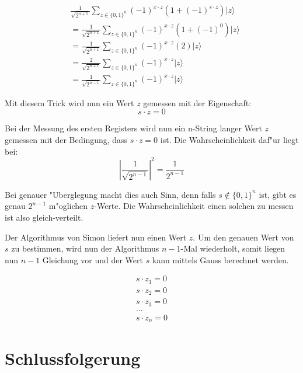 \begin{refsection}
\begin{align*}
    &\frac1{\sqrt{2^{n + 1}}}
      \sum_{z \in \{0,1\}^n}  { (-1)^{x \cdot z} ( 1 + (-1)^{ s \cdot z}) |z\rangle } 
    \\
    &= 
    \frac1{\sqrt{2^{n + 1}}}
      \sum_{z \in \{0,1\}^n}  { (-1)^{x \cdot z} ( 1 + (-1)^0) |z\rangle } 
    \\
    &= 
    \frac1{\sqrt{2^{n + 1}}}
      \sum_{z \in \{0,1\}^n}  { (-1)^{x \cdot z} (2) |z\rangle } 
    \\
    &= 
    \frac{2}{\sqrt{2^{n + 1}}} 
      \sum_{z \in \{0,1\}^n}  { (-1)^{x \cdot z}|z\rangle } 
    \\
    &= 
    \frac1{\sqrt{2^{n - 1}}} 
      \sum_{z \in \{0,1\}^n}  { (-1)^{x \cdot z}|z\rangle } 
\end{align*}

Mit diesem Trick wird nun ein Wert $z$ gemessen mit der Eigenschaft:
\[
    s \cdot z = 0
\]

Bei der Messung des ersten Registers wird nun ein n-String langer Wert $z$
gemessen mit der Bedingung, dass $s \cdot z = 0$ ist. Die Wahrscheinlichkeit
daf"ur liegt bei:
\[
    |\frac1{\sqrt{2^{n - 1}}}|^2 = \frac1{2^{n-1}} 
\]

Bei genauer "Uberglegung macht dies auch Sinn, denn falls $s \notin \{0,1\}^n$
ist, gibt es genau $2^{n-1}$ m"oglichen $z$-Werte. Die Wahrscheinlichkeit einen
solchen zu messen ist also gleich-verteilt.

Der Algorithmus von Simon liefert nun einen Wert $z$. Um den genauen Wert von
$s$ zu bestimmen, wird nun der Algorithmus $n-1$-Mal wiederholt, somit liegen
nun $n-1$ Gleichung vor und der Wert $s$ kann mittels Gauss berechnet werden.

\begin{align*}
    s \cdot z_{1} = 0
    \\
    s \cdot z_{2} = 0
    \\
    s \cdot z_{3} = 0
    \\
    ...
    \\
    s \cdot z_{n} = 0
\end{align*}


\section{Schlussfolgerung}

\begin{figure}[H]
\centering
{}
\end{figure}


\end{refsection}
